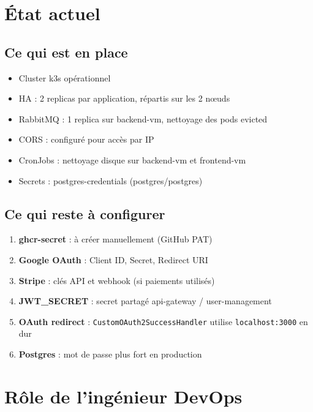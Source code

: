 \documentclass[11pt,a4paper]{article}
\begin{document}
\section{État actuel}

\subsection{Ce qui est en place}

\begin{itemize}
  \item Cluster k3s opérationnel
  \item HA : 2 replicas par application, répartis sur les 2 nœuds
  \item RabbitMQ : 1 replica sur backend-vm, nettoyage des pods evicted
  \item CORS : configuré pour accès par IP
  \item CronJobs : nettoyage disque sur backend-vm et frontend-vm
  \item Secrets : postgres-credentials (postgres/postgres)
\end{itemize}

\subsection{Ce qui reste à configurer}

\begin{enumerate}
  \item \textbf{ghcr-secret} : à créer manuellement (GitHub PAT)
  \item \textbf{Google OAuth} : Client ID, Secret, Redirect URI
  \item \textbf{Stripe} : clés API et webhook (si paiements utilisés)
  \item \textbf{JWT\_SECRET} : secret partagé api-gateway / user-management
  \item \textbf{OAuth redirect} : \texttt{CustomOAuth2SuccessHandler} utilise \texttt{localhost:3000} en dur
  \item \textbf{Postgres} : mot de passe plus fort en production
\end{enumerate}

\section{Rôle de l'ingénieur DevOps}
\end{document}
